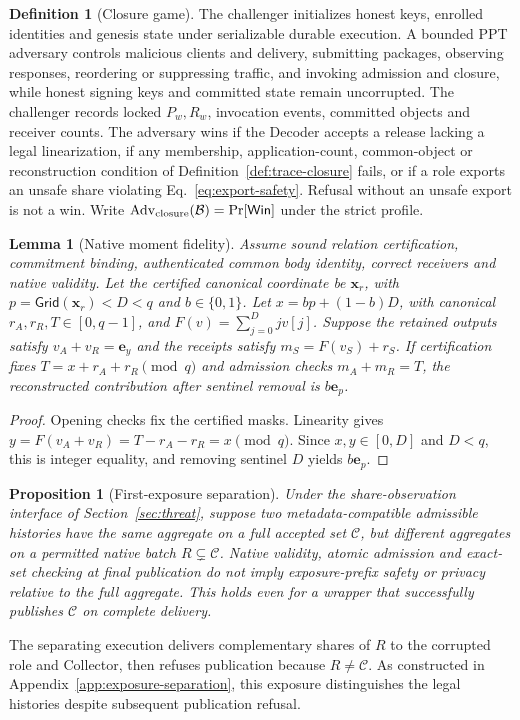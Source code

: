 \documentclass[conference,compsoc]{IEEEtran}
\theoremstyle{definition}
\newtheorem{definition}{Definition}[section]
\newtheorem{definition}{Definition}
\numberwithin{equation}{section}
\numberwithin{table}{section}
\numberwithin{figure}{section}
\theoremstyle{plain}
\newtheorem{lemma}{Lemma}[section]
\newtheorem{proposition}{Proposition}[section]
\newtheorem{lemma}{Lemma}
\newtheorem{proposition}{Proposition}
\begin{document}
\begin{definition}[Closure game]
\label{game:closure}
The challenger initializes honest keys, enrolled identities and genesis state under serializable durable execution. A bounded PPT adversary controls malicious clients and delivery, submitting packages, observing responses, reordering or suppressing traffic, and invoking admission and closure, while honest signing keys and committed state remain uncorrupted. The challenger records locked \(P_w,R_w\), invocation events, committed objects and receiver counts. The adversary wins if the Decoder accepts a release lacking a legal linearization, if any membership, application-count, common-object or reconstruction condition of Definition~\ref{def:trace-closure} fails, or if a role exports an unsafe share violating Eq.~\eqref{eq:export-safety}. Refusal without an unsafe export is not a win. Write \(\operatorname{Adv}_{\rm closure}(\mathcal B)=\Pr[\mathsf{Win}]\) under the strict profile.
\end{definition}

\begin{lemma}[Native moment fidelity]
\label{lem:native-moment-fidelity}
Assume sound relation certification, commitment binding, authenticated common
body identity, correct receivers and native validity. Let the certified
canonical coordinate be \(\mathbf x_r\), with \(p=\mathsf{Grid}(\mathbf x_r)<D<q\)
and \(b\in\{0,1\}\). Let \(x=bp+(1-b)D\), with canonical
\(r_A,r_R,T\in[0,q-1]\), and \(F(v)=\sum_{j=0}^{D}jv[j]\). Suppose the
retained outputs satisfy \(v_A+v_R=\mathbf e_y\) and the receipts satisfy
\(m_S=F(v_S)+r_S\).
If certification fixes \(T=x+r_A+r_R\pmod q\) and admission checks
\(m_A+m_R=T\), the reconstructed contribution after sentinel removal is
\(b\mathbf e_p\).
\end{lemma}
\begin{proof}
Opening checks fix the certified masks. Linearity gives
\(y=F(v_A+v_R)=T-r_A-r_R=x\pmod q\).
Since \(x,y\in[0,D]\) and \(D<q\), this is integer equality, and
removing sentinel \(D\) yields \(b\mathbf e_p\).
\end{proof}

\begin{proposition}[First-exposure separation]
\label{prop:exposure-separation}
Under the share-observation interface of Section~\ref{sec:threat}, suppose
two metadata-compatible admissible histories have the same aggregate
on a full accepted set \(\mathcal C\), but different aggregates on a permitted native
batch \(R\subsetneq\mathcal C\). Native validity, atomic admission and exact-set
checking at final publication do not imply exposure-prefix safety or privacy
relative to the full aggregate. This holds even for a wrapper that successfully
publishes \(\mathcal C\) on complete delivery.
\end{proposition}
The separating execution delivers complementary shares of \(R\) to the
corrupted role and Collector, then refuses publication because \(R\ne\mathcal C\).
As constructed in Appendix~\ref{app:exposure-separation}, this exposure distinguishes the legal histories despite subsequent publication refusal.
\end{document}
